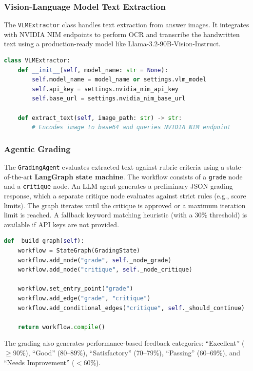 \documentclass[11pt,a4paper]{article}
\begin{document}
\subsubsection{Vision-Language Model Text Extraction}
The \texttt{VLMExtractor} class handles text extraction from answer images. It integrates with NVIDIA NIM endpoints to perform OCR and transcribe the handwritten text using a production-ready model like Llama-3.2-90B-Vision-Instruct.

\begin{lstlisting}[language=Python, caption={VLM text extraction interface}]
class VLMExtractor:
    def __init__(self, model_name: str = None):
        self.model_name = model_name or settings.vlm_model
        self.api_key = settings.nvidia_nim_api_key
        self.base_url = settings.nvidia_nim_base_url

    def extract_text(self, image_path: str) -> str:
        # Encodes image to base64 and queries NVIDIA NIM endpoint
\end{lstlisting}

\subsubsection{Agentic Grading}
The \texttt{GradingAgent} evaluates extracted text against rubric criteria using a state-of-the-art \textbf{LangGraph state machine}. The workflow consists of a \texttt{grade} node and a \texttt{critique} node. An LLM agent generates a preliminary JSON grading response, which a separate critique node evaluates against strict rules (e.g., score limits). The graph iterates until the critique is approved or a maximum iteration limit is reached. A fallback keyword matching heuristic (with a 30\% threshold) is available if API keys are not provided.

\begin{lstlisting}[language=Python, caption={LangGraph state machine setup}]
def _build_graph(self):
    workflow = StateGraph(GradingState)
    workflow.add_node("grade", self._node_grade)
    workflow.add_node("critique", self._node_critique)
    
    workflow.set_entry_point("grade")
    workflow.add_edge("grade", "critique")
    workflow.add_conditional_edges("critique", self._should_continue)
    
    return workflow.compile()
\end{lstlisting}

The grading also generates performance-based feedback categories: ``Excellent'' ($\geq$90\%), ``Good'' (80--89\%), ``Satisfactory'' (70--79\%), ``Passing'' (60--69\%), and ``Needs Improvement'' ($<$60\%).
\end{document}
